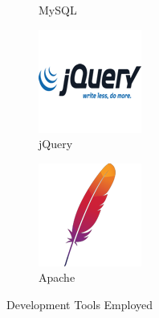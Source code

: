 \begin{figure}[H]
\begin{subfigure}[t]{0.2\linewidth}
        \caption{MySQL}\label{fig:MySQL}        
    \end{subfigure}
    \quad
    \begin{subfigure}[t]{0.2\linewidth}
        \centering
        \includegraphics[width=\linewidth]{Images/Generic/Icons/jQuery}
        \caption{jQuery}\label{fig:jQuery}
    \end{subfigure}
    \quad
    \begin{subfigure}[t]{0.2\linewidth}
        \centering
        \includegraphics[width=\linewidth]{Images/Generic/Icons/Apache}
        \caption{Apache}\label{fig:Apache}
    \end{subfigure}
    \caption{Development Tools Employed}\label{fig:DevelopmentTools}
\end{figure}

